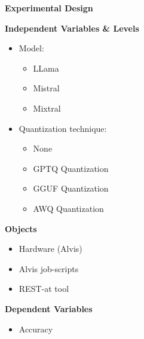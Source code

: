 \documentclass[conference]{IEEEtran}
\begin{document}
\begin{center}
   \begin{center}
        \textbf{Experimental Design}
    \end{center}
    \begin{tcbraster}[raster columns=2, raster column skip=5pt, raster equal height=rows, raster row skip=5pt]
        \begin{roundedBox}
            \centering
            \textbf{Independent Variables \& Levels}
            \begin{itemize}
                \item Model:
                    \begin{itemize}
                        \item LLama
                        \item Mistral
                        \item Mixtral
                    \end{itemize}
                \item Quantization technique:
                    \begin{itemize}
                        \item None
                        \item GPTQ Quantization
                        \item GGUF Quantization
                        \item AWQ Quantization %
                    \end{itemize}
            \end{itemize}
        \end{roundedBox}
        \begin{roundedBox}
            \centering
            \textbf{Objects}
            \begin{itemize}
                \item Hardware (Alvis)
                \item Alvis job-scripts
                \item REST-at tool
            \end{itemize}
        \end{roundedBox}
        \begin{roundedBox}
            \centering
            \textbf{Dependent Variables}
            \begin{itemize}
                \item Accuracy

\end{itemize}
\end{roundedBox}
\end{tcbraster}
\end{center}
\end{document}
